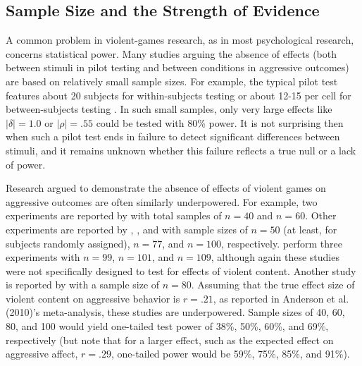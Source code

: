 \documentclass[man]{apa6}
\begin{document}
\subsection{Sample Size and the Strength of Evidence}
A common problem in violent-games research, as in most psychological research, concerns statistical power. Many studies arguing the absence of effects (both between stimuli in pilot testing and between conditions in aggressive outcomes) are based on relatively small sample sizes.   For example, the typical pilot test features about 20 subjects for within-subjects testing \citep[e.g.,][]{Arriaga:etal:2008} or about 12-15 per cell for between-subjects testing \citep[e.g.,][]{Anderson:etal:2004,Valadez:Ferguson:2012}. In such small samples, only very large effects like $|\delta| = 1.0$ or $|\rho| = .55$ could be tested with 80\% power. It is not surprising then when such a pilot test ends in failure to detect significant differences between stimuli, and it remains unknown whether this failure reflects a true null or a lack of power.

Research argued to demonstrate the absence of effects of violent games on aggressive outcomes are often similarly underpowered. For example, two experiments are reported by \citet{Adachi:Willoughby:2011} with total samples of $n = 40$ and $n = 60$. Other experiments are reported by \citet{Ferguson:etal:2008}, \citet{Ferguson:Rueda:2010}, and \citet{Valadez:Ferguson:2012} with sample sizes of $n = 50$ (at least, for subjects randomly assigned), $n = 77$, and $n = 100$, respectively. \citet[Studies 1, 2, and 5]{Przybylski:etal:2014} perform three experiments with $n = 99$, $n = 101$, and $n = 109$, although again these studies were not specifically designed to test for effects of violent content. Another study is reported by \citet{Elson:etal:2013} with a sample size of $ n = 80 $. Assuming that the true effect size of violent content on aggressive behavior is $r = .21$, as reported in Anderson et al. (2010)'s meta-analysis, these studies are underpowered. Sample sizes of 40, 60, 80, and 100 would yield one-tailed test power of 38\%, 50\%, 60\%, and 69\%, respectively (but note that for a larger effect, such as the expected effect on aggressive affect, $r = .29$, one-tailed power would be 59\%, 75\%, 85\%, and 91\%). 
\end{document}

